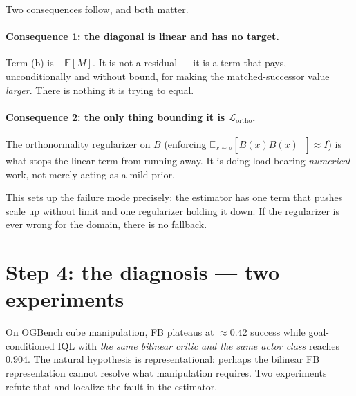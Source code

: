 \documentclass[11pt]{article}
\newcommand{\E}{\mathbb{E}}
\begin{document}
Two consequences follow, and both matter.

\paragraph{Consequence 1: the diagonal is linear and has no target.} Term (b) is
$-\E[M]$. It is not a residual --- it is a term that pays, unconditionally and
without bound, for making the matched-successor value \emph{larger}. There is
nothing it is trying to equal.

\paragraph{Consequence 2: the only thing bounding it is $\mathcal{L}_{\mathrm{ortho}}$.}
The orthonormality regularizer on $B$ (enforcing $\E_{x\sim\rho}[B(x)B(x)^\top]\approx I$)
is what stops the linear term from running away. It is doing load-bearing
\emph{numerical} work, not merely acting as a mild prior.

\medskip
This sets up the failure mode precisely: the estimator has one term that pushes
scale up without limit and one regularizer holding it down. If the regularizer is
ever wrong for the domain, there is no fallback.

\section{Step 4: the diagnosis --- two experiments}
\label{sec:diagnosis}

On OGBench cube manipulation, FB plateaus at $\approx 0.42$ success while
goal-conditioned IQL with \emph{the same bilinear critic and the same actor class}
reaches $0.904$. The natural hypothesis is representational: perhaps the bilinear
FB representation cannot resolve what manipulation requires. Two experiments
refute that and localize the fault in the estimator.
\end{document}
